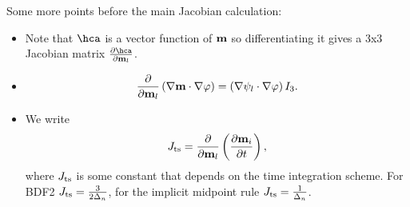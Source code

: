 Some more points before the main Jacobian calculation:
\begin{itemize}
\item Note that $\hca$ is a vector function of $\mathbf{m}$ so differentiating it gives a 3x3 Jacobian matrix  $\pd{\hca}{\mv_l}$.

\item 
  \begin{equation}
    \frac{\partial }{\partial \mathbf{m}_l} \left(\nabla \mathbf{m} \cdot \nabla \varphi\right) =
    \left(\nabla \psi_l \cdot \nabla \varphi \right) I_3.
  \end{equation}

\item We write
  \begin{equation}
    J_\text{ts} = \frac{\partial }{\partial \mathbf{m}_l} \left(\frac{\partial \mathbf{m}_i}{\partial t} \right),
  \end{equation}
  where $J_\text{ts}$ is some constant that depends on the time integration scheme.
  For BDF2 $J_\text{ts} = \frac{3}{2\Delta_{n}}$, for the implicit midpoint rule $J_\text{ts} = \frac{1}{\Delta_{n}}$.
\end{itemize}



